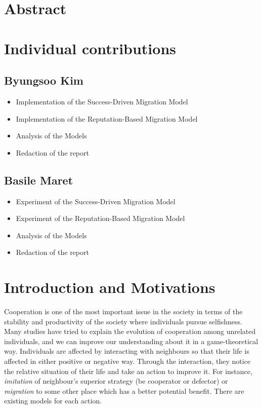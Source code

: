 \documentclass[11pt]{article}
\begin{document}
\newpage




\section{Abstract}

\newpage
\section{Individual contributions}
\subsection{Byungsoo Kim}
\begin{itemize}
\item Implementation of the Success-Driven Migration Model
\item Implementation of the Reputation-Based Migration Model
\item Analysis of the Models
\item Redaction of the report
\end{itemize}

\subsection{Basile Maret}
\begin{itemize}
\item Experiment of the Success-Driven Migration Model
\item Experiment of the Reputation-Based Migration Model
\item Analysis of the Models
\item Redaction of the report
\end{itemize}

\newpage
\section{Introduction and Motivations}

Cooperation is one of the most important issue in the society in terms of the stability and productivity of the society where individuals pursue selfishness. Many studies have tried to explain the evolution of cooperation among unrelated individuals, and we can improve our understanding about it in a game-theoretical way. Individuals are affected by interacting with neighbours so that their life is affected in either positive or negative way. Through the interaction, they notice the relative situation of their life and take an action to improve it. For instance, \textit{imitation} of neighbour's superior strategy (be cooperator or defector) or \textit{migration} to some other place which has a better potential benefit. There are existing models for each action.
\end{document}

